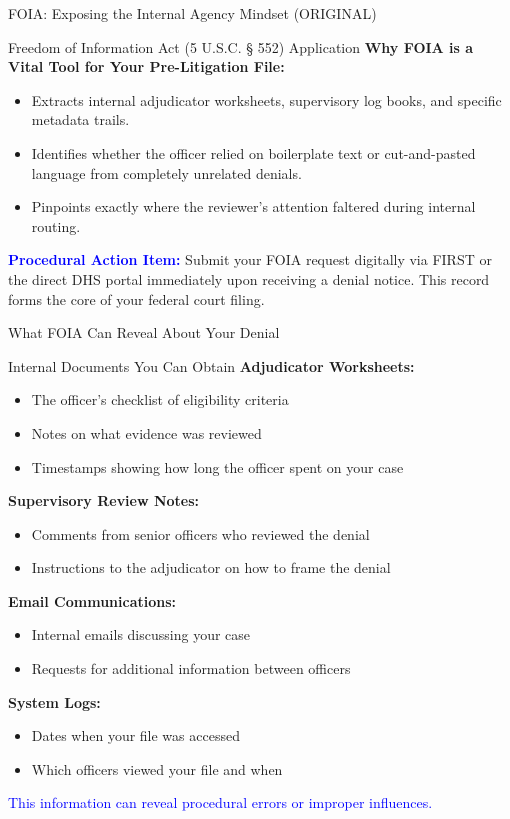 \documentclass[11pt]{beamer}
\begin{document}
	
	\begin{frame}{FOIA: Exposing the Internal Agency Mindset (ORIGINAL)}
		\scriptsize
		\begin{block}{Freedom of Information Act (5 U.S.C. § 552) Application}
			\textbf{Why FOIA is a Vital Tool for Your Pre-Litigation File:}
			\begin{itemize}
				\item Extracts internal adjudicator worksheets, supervisory log books, and specific metadata trails.
				\item Identifies whether the officer relied on boilerplate text or cut-and-pasted language from completely unrelated denials.
				\item Pinpoints exactly where the reviewer's attention faltered during internal routing.
			\end{itemize}
			\textcolor{blue}{\textbf{Procedural Action Item:}} Submit your FOIA request digitally via FIRST or the direct DHS portal immediately upon receiving a denial notice. This record forms the core of your federal court filing.
		\end{block}
	\end{frame}
	
	\begin{frame}{What FOIA Can Reveal About Your Denial}
		\scriptsize
		\begin{block}{Internal Documents You Can Obtain}
			\textbf{Adjudicator Worksheets:}
			\begin{itemize}
				\item The officer's checklist of eligibility criteria
				\item Notes on what evidence was reviewed
				\item Timestamps showing how long the officer spent on your case
			\end{itemize}
			\textbf{Supervisory Review Notes:}
			\begin{itemize}
				\item Comments from senior officers who reviewed the denial
				\item Instructions to the adjudicator on how to frame the denial
			\end{itemize}
			\textbf{Email Communications:}
			\begin{itemize}
				\item Internal emails discussing your case
				\item Requests for additional information between officers
			\end{itemize}
			\textbf{System Logs:}
			\begin{itemize}
				\item Dates when your file was accessed
				\item Which officers viewed your file and when
			\end{itemize}
			\textcolor{blue}{This information can reveal procedural errors or improper influences.}
		\end{block}
	\end{frame}
	
\end{document}
